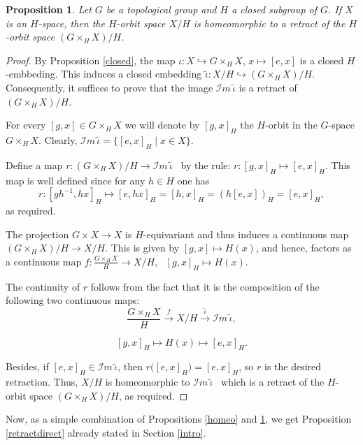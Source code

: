 \documentclass{amsart}
\newtheorem{proposition}[theorem]{Proposition}
\begin{document}
 \begin{proposition}\label{retract}
 Let $G$ be a topological group and $H$ a closed subgroup of  $G$. If $X$ is an $H$-space, then 
 the $H$-orbit space $X/H$ is homeomorphic to a retract of the $H$-orbit space $({G \times_H X})/H$.
  \end{proposition}
 \begin{proof}By Proposition \ref{closed}, the map $\iota: X\hookrightarrow G\times_HX$, $x\mapsto [e, x]$ is a closed
 $H$-embbeding. This induces a closed embedding 
 $\tilde \iota: X/H\hookrightarrow (G\times_HX)/H$. Consequently, it suffices to prove that the image $\mathcal Im\,  \tilde \iota $ is a retract of $(G\times_HX)/H$. 
 
 
  For every $[g, x]\in G \times_H X$ we will denote by $[g, x]_H$ the $H$-orbit in the $G$-space $G \times_H X$. 
  Clearly,  $\mathcal Im\,  \tilde \iota =\{[e, x]_H \mid x\in X\}.$ 

 
 Define a map $r: (G\times_HX)/H\to \mathcal Im\,  \tilde \iota $ \  by the rule:  $r: [g, x]_H\mapsto [e, x]_H$.  This map is well defined since for any 
 $h\in H$ one has 
 $$r: [gh^{-1}, hx]_H\mapsto [e, hx]_H=[h, x]_H= (h[e, x])_H= [e, x]_H,$$
 as required. 
 
The projection $G\times X\to X$  is $H$-equivariant and thus induces a continuous map $(G\times_HX)/H\to X/H$. 
This is given by $[g, x]\mapsto H(x)$,  and hence, factors as a continuous map $f:  \frac{G \times_H X}{H} \longrightarrow     X/H$, \ $[g, x]_H\mapsto H(x)$.
  
 The continuity of $r$ follows from the fact that it is the composition of the following two continuous maps:
   $$ \frac{G \times_H X}{H} \stackrel{ f}{\longrightarrow}     X/H  \stackrel{  \tilde \iota}{\longrightarrow}     \mathcal Im\,  \tilde \iota, $$ 
   
$$[g, x]_H \mapsto H(x) \mapsto [e, x]_H.$$    
    
    \medskip
        
 Besides, if $[e, x]_H \in \mathcal Im\,  \tilde \iota$,  then $r\big([e, x]_H\big)=  [e, x]_H$, so $r$ is the desired retraction.
  Thus, $X/H$ is homeomorphic to  $\mathcal Im\,  \tilde \iota$ \ which is  a retract of the $H$-orbit space $({G \times_H X})/H$, as required.             
  \end{proof}
    
    \medskip
    
    Now, as a simple combination of Propositions  \ref{homeo} and \ref{retract}, we get  Proposition \ref{retractdirect} already stated in Section \ref{intro}.
\end{document}
